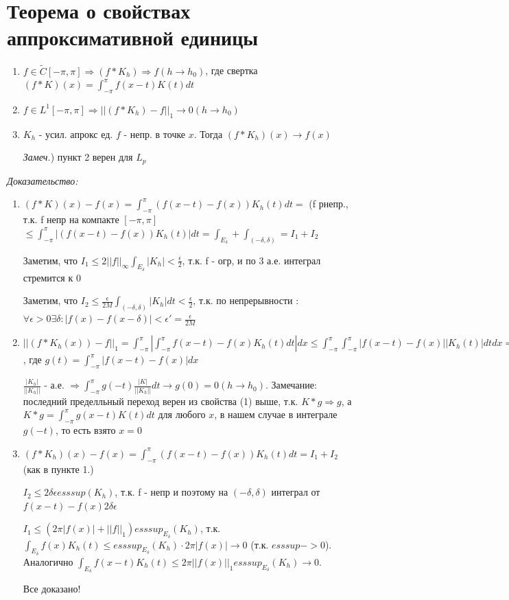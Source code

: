 \documentclass[paper=a4, fontsize=17pt]{article}
\begin{document}
\section{Теорема о свойствах аппроксимативной единицы}
\begin{enumerate}
    \item $f \in \widetilde{C}[-\pi, \pi] \Rightarrow (f * K_h) \Rightarrow f (h \rightarrow h_0)$, где
    свертка $(f* K)(x) = \int_{-\pi}^{\pi} f(x-t)K(t)dt$
    \item $f \in L^1 [-\pi, \pi] \Rightarrow ||(f * K_h) - f||_1 \rightarrow 0 (h \rightarrow h_0)$
    \item $K_h$ - усил. апрокс ед. $f$ - непр. в точке $x$. Тогда $(f * K_h)(x) \rightarrow f(x)$

    \emph{Замеч.}) пункт 2 верен для $ L_p $
\end{enumerate}
\emph{Доказательство:}
	\begin{enumerate}
		\item $(f*K)(x) - f(x) =  \int_{-\pi}^{\pi} (f(x-t)-f(x))K_h(t)dt = $ (f рнепр., т.к. f непр на компакте $[-\pi, \pi]$  $\leq \int_{-\pi}^{\pi} |(f(x-t)-f(x))K_h(t)|dt = \int_{E_{\delta}} + \int_{(-\delta, \delta)} = I_1 + I_2$

		Заметим, что $I_1 \leq 2 ||f||_{\infty}\int_{E_{\delta}}|K_h| < \frac{\epsilon}{2}$, т.к. f - огр, и по 3  а.е. интеграл стремится к 0

		Заметим, что $I_2 \leq \frac{\epsilon}{2 M} \int_{(-\delta, \delta)}|K_h|dt < \frac{\epsilon}{2}$, т.к. по непрерывности : $\forall \epsilon > 0 \exists \delta : |f(x) - f(x - \delta)| < \epsilon' = \frac{\epsilon}{2 M}$

		\item $||(f * K_h(x)) - f||_1 = \int_{-\pi}^{\pi} |\int_{-\pi}^{\pi} f(x-t)-f(x)K_h(t)dt|dx \leq \int_{-\pi}^{\pi}\int_{-\pi}^{\pi}|f(x-t)-f(x)||K_h(t)|dtdx = ||K_h||_1 \int_{-\pi}^{\pi}g(-t)\frac{K(t)}{||K_h||_1}dt$, где $g(t) = \int_{-\pi}^{\pi}|f(x-t)-f(x)|dx$

		$\frac{|K_h|}{||K_h||}$ - а.е. $\Rightarrow \int_{-\pi}^{\pi}g(-t)\frac{|K|}{||K_h||}dt \rightarrow g(0) = 0 (h \rightarrow h_0)$. Замечание: последний пределльный переход верен из свойства (1) выше, т.к. $K*g \Rightarrow g$, а $K*g = \int_{-\pi}^{\pi}g(x-t)K(t)dt$ для любого $x$, в нашем случае в интеграле $g(-t)$, то есть взято $x = 0$

		\item $(f*K_h)(x) - f(x) = \int_{-\pi}^{\pi} (f(x-t)-f(x))K_h(t)dt = I_1 + I_2$ (как в пункте 1.)

		$I_2 \leq 2 \delta \epsilon esssup(K_h) $, т.к. f - непр и поэтому на $(-\delta, \delta)$ интеграл от $f(x-t)-f(x) 2 \delta \epsilon$

		$I_1 \leq (2 \pi |f(x)| + ||f||_1 ) esssup_{E_{\delta}}(K_h) $, т.к. $\int_{E_{\delta}} f(x)K_h(t) \leq esssup_{E_{\delta}}(K_h) \cdot 2 \pi |f(x)| \rightarrow 0$ (т.к. $esssup -> 0$). Аналогично $\int_{E_{\delta}} f(x-t)K_h(t) \leq 2 \pi ||f(x)||_1 esssup_{E_{\delta}}(K_h) \rightarrow 0$.

		Все доказано!

	\end{enumerate}
\end{document}
